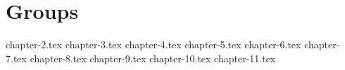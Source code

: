 \part{Groups}
\setcounter{chapter}{1}
{chapter-2.tex}
{chapter-3.tex}
{chapter-4.tex}
{chapter-5.tex}
{chapter-6.tex}
{chapter-7.tex}
{chapter-8.tex}
{chapter-9.tex}
{chapter-10.tex}
{chapter-11.tex}

